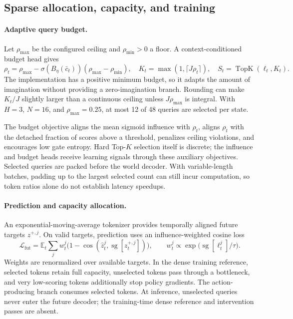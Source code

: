 \documentclass{article}
\newcommand{\sg}{\operatorname{sg}}
\newcommand{\TopK}{\operatorname{TopK}}
\newcommand{\E}{\mathbb{E}}
\begin{document}
\subsection{Sparse allocation, capacity, and training}
\label{sec:training}
\paragraph{Adaptive query budget.}
Let $\rho_{\max}$ be the configured ceiling and $\rho_{\min}>0$ a floor. A context-conditioned budget head gives
\begin{equation}
\rho_t=\rho_{\max}-\sigma(B_\eta(\bar c_t))(\rho_{\max}-\rho_{\min}),
\quad K_t=\max(1,\lceil J\rho_t\rceil),
\quad S_t=\TopK(\ell_t,K_t).
\label{eq:budget}
\end{equation}
The implementation has a positive minimum budget, so it adapts the amount of imagination without providing a zero-imagination branch. Rounding can make $K_t/J$ slightly larger than a continuous ceiling unless $J\rho_{\max}$ is integral. With $H=3$, $N=16$, and $\rho_{\max}=0.25$, at most 12 of 48 queries are selected per state.

The budget objective aligns the mean sigmoid influence with $\rho_t$, aligns $\rho_t$ with the detached fraction of scores above a threshold, penalizes ceiling violations, and encourages low gate entropy. Hard Top-$K$ selection itself is discrete; the influence and budget heads receive learning signals through these auxiliary objectives. Selected queries are packed before the world decoder. With variable-length batches, padding up to the largest selected count can still incur computation, so token ratios alone do not establish latency speedups.

\paragraph{Prediction and capacity allocation.}
An exponential-moving-average tokenizer provides temporally aligned future targets $z^{+,j}$. On valid targets, prediction uses an influence-weighted cosine loss
\begin{equation}
\mathcal L_{\mathrm{fut}}
=\E_t\sum_j w_t^j\big(1-\cos(\widehat z_t^j,\sg[z_t^{+,j}])\big),
\qquad
w_t^j\propto\exp\!\big(\sg[\ell_t^j]/\tau\big).
\label{eq:future}
\end{equation}
Weights are renormalized over available targets. In the dense training reference, selected tokens retain full capacity, unselected tokens pass through a bottleneck, and very low-scoring tokens additionally stop policy gradients. The action-producing branch consumes selected tokens. At inference, unselected queries never enter the future decoder; the training-time dense reference and intervention passes are absent.
\end{document}
